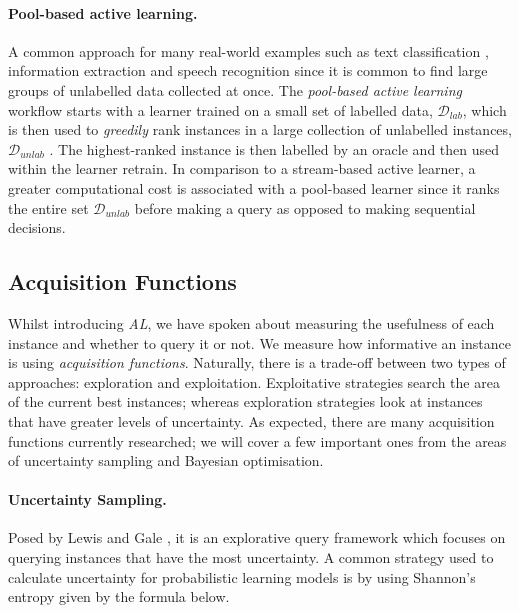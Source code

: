 \documentclass[ %
                    author={James Stephenson},
                supervisor={Dr. Edwin Simpson},
                    degree={MSc},
                     title={PROJECT PLAN},
                  subtitle={Bayesian Deep Learning For Extractive Test Summarisation},
                      type={},
                      year={2022}]{../additions/dissertation}
\begin{document}
				\paragraph{Pool-based active learning.} A common approach for many real-world examples such as text classification \cite{Lewis94}, information extraction \cite{Thompson99} and speech recognition \cite{Tur05} since it is common to find large groups of unlabelled data collected at once. The \emph{pool-based active learning} workflow starts with a learner trained on a small set of labelled data, $ \mathcal{D}_{lab} $, which is then used to \emph{greedily} rank instances in a large collection of unlabelled instances, $\mathcal{D}_{unlab} $ \cite{Lewis94}. The highest-ranked instance is then labelled by an oracle and then used within the learner retrain. In comparison to a stream-based active learner, a greater computational cost is associated with a pool-based learner since it ranks the entire set $\mathcal{D}_{unlab}$ before making a query as opposed to making sequential decisions.
	
			\subsection{Acquisition Functions}
			\label{chap:literaturereview:active:acquisition}
		
				Whilst introducing \emph{AL}, we have spoken about measuring the usefulness of each instance and whether to query it or not. We measure how informative an instance is using \emph{acquisition functions}. Naturally, there is a trade-off between two types of approaches: exploration and exploitation. Exploitative strategies search the area of the current best instances; whereas exploration strategies look at instances that have greater levels of uncertainty. As expected, there are many acquisition functions currently researched; we will cover a few important ones from the areas of uncertainty sampling and Bayesian optimisation.

				\paragraph{Uncertainty Sampling.} Posed by Lewis and Gale \cite{Lewis94}, it is an explorative query framework which focuses on querying instances that have the most uncertainty. A common strategy used to calculate uncertainty for probabilistic learning models is by using Shannon’s entropy \cite{Shannon48} given by the formula below.
\end{document}
